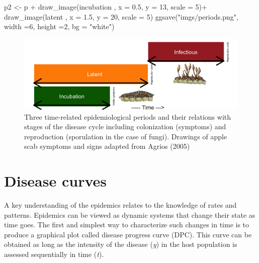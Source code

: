 \documentclass[
  letterpaper,
  DIV=11,
  numbers=noendperiod]{scrreprt}
\newenvironment{Shaded}{\begin{snugshade}}{\end{snugshade}}
\newcommand{\AttributeTok}[1]{\textcolor[rgb]{0.40,0.45,0.13}{#1}}
\newcommand{\DecValTok}[1]{\textcolor[rgb]{0.68,0.00,0.00}{#1}}
\newcommand{\FloatTok}[1]{\textcolor[rgb]{0.68,0.00,0.00}{#1}}
\newcommand{\FunctionTok}[1]{\textcolor[rgb]{0.28,0.35,0.67}{#1}}
\newcommand{\NormalTok}[1]{\textcolor[rgb]{0.00,0.23,0.31}{#1}}
\newcommand{\OtherTok}[1]{\textcolor[rgb]{0.00,0.23,0.31}{#1}}
\newcommand{\SpecialCharTok}[1]{\textcolor[rgb]{0.37,0.37,0.37}{#1}}
\newcommand{\StringTok}[1]{\textcolor[rgb]{0.13,0.47,0.30}{#1}}
\begin{document}
\begin{Shaded}
\begin{Highlighting}[]
\NormalTok{  p2 }\OtherTok{\textless{}{-}}\NormalTok{ p }\SpecialCharTok{+} \FunctionTok{draw\_image}\NormalTok{(incubation , }\AttributeTok{x =} \FloatTok{0.5}\NormalTok{, }\AttributeTok{y =} \DecValTok{13}\NormalTok{, }\AttributeTok{scale =} \DecValTok{5}\NormalTok{)}\SpecialCharTok{+}
    \FunctionTok{draw\_image}\NormalTok{(latent , }\AttributeTok{x =} \FloatTok{1.5}\NormalTok{, }\AttributeTok{y =} \DecValTok{20}\NormalTok{, }\AttributeTok{scale =} \DecValTok{5}\NormalTok{)}
  \FunctionTok{ggsave}\NormalTok{(}\StringTok{"imgs/periods.png"}\NormalTok{, }\AttributeTok{width =}\DecValTok{6}\NormalTok{, }\AttributeTok{height =}\DecValTok{2}\NormalTok{, }\AttributeTok{bg =} \StringTok{"white"}\NormalTok{)  }
\end{Highlighting}
\end{Shaded}

\begin{figure}

{\centering \includegraphics{imgs/periods.png}

}

\caption{\label{fig-periods}Three time-related epidemiological periods
and their relations with stages of the disease cycle including
colonization (symptoms) and reproduction (sporulation in the case of
fungi). Drawings of apple scab symptoms and signs adapted from Agrios
(2005)}

\end{figure}

\hypertarget{disease-curves}{%
\section{Disease curves}\label{disease-curves}}

A key understanding of the epidemics relates to the knowledge of rates
and patterns. Epidemics can be viewed as dynamic systems that change
their state as time goes. The first and simplest way to characterize
such changes in time is to produce a graphical plot called disease
progress curve (DPC). This curve can be obtained as long as the
intensity of the disease (\emph{y}) in the host population is assessed
sequentially in time (\emph{t}).
\end{document}
